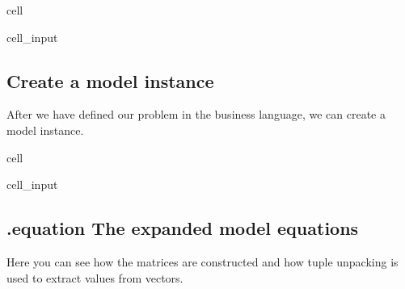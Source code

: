\documentclass[letterpaper,10pt,english]{jupyterBook}
\begin{document}
\begin{sphinxuseclass}{cell}
\begin{sphinxVerbatimInput}
\begin{sphinxuseclass}{cell_input}
\end{sphinxuseclass}\end{sphinxVerbatimInput}

\end{sphinxuseclass}

\subsection{Create a model instance}
\label{\detokenize{content/howto/optimization/Optimize_simpel:create-a-model-instance}}
\sphinxAtStartPar
After we have defined our problem in the business language, we can create a model instance.

\begin{sphinxuseclass}{cell}\begin{sphinxVerbatimInput}

\begin{sphinxuseclass}{cell_input}
\begin{sphinxVerbatim}[commandchars=\\\{\}]
  
\end{sphinxVerbatim}

\end{sphinxuseclass}\end{sphinxVerbatimInput}

\end{sphinxuseclass}

\subsection{.equation The expanded model equations}
\label{\detokenize{content/howto/optimization/Optimize_simpel:equation-the-expanded-model-equations}}
\sphinxAtStartPar
Here you can see how the matrices are constructed and how tuple unpacking is used to extract values from vectors.
\end{document}
